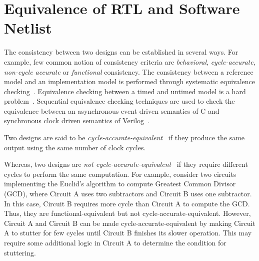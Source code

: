 \section{Equivalence of RTL and Software Netlist}
%
The consistency between two designs can be established in several ways. 
For example, few common notion of consistency criteria are \emph{behavioral}, 
\emph{cycle-accurate}, \emph{non-cycle accurate} or \emph{functional}
consistency.  The consistency between a reference model and an implementation
model is performed through systematic equivalence checking~\cite{CKY03,DBLP:conf/date/KoelblJJP09,DBLP:journals/tcad/StoffelK04,DBLP:conf/date/Eijk98,DBLP:conf/iccd/BaumgartnerMPKJ06}.  Equivalence checking between a timed and untimed model is a hard
problem~\cite{kuehlmann2002combinational}.  Sequential equivalence checking techniques 
are used to check the equivalence between an asynchronous event driven semantics of C and synchronous 
clock driven semantics of Verilog~\cite{CKY03, DBLP:conf/iccd/BaumgartnerMPKJ06}.


Two designs are said to be \emph{cycle-accurate-equivalent}~\cite{cycle,kuehlmann2002combinational} if they produce the same output using the same number of clock cycles.   

Whereas, two designs are \emph{not cycle-accurate-equivalent}~\cite{cycle} if they require 
different cycles to perform the same computation. For example, consider two circuits
implementing the Euclid's algorithm to compute Greatest Common Divisor (GCD),
where Circuit A uses two subtractors and Circuit B uses one subtractor.  In this
case, Circuit B requires more cycle than Circuit A to compute the GCD. Thus,
they are functional-equivalent but not cycle-accurate-equivalent. However,
Circuit A and Circuit B can be made cycle-accurate-equivalent by making Circuit
A to stutter for few cycles until Circuit B finishes its slower operation.  This
may require some additional logic in Circuit A to determine the condition for 
stuttering.  



